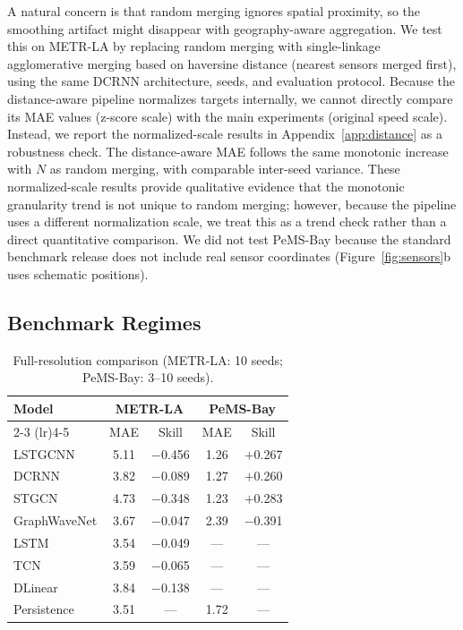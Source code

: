 \documentclass[sigconf]{acmart}
\begin{document}
A natural concern is that random merging ignores spatial proximity, so the smoothing artifact might disappear with geography-aware aggregation. We test this on METR-LA by replacing random merging with single-linkage agglomerative merging based on haversine distance (nearest sensors merged first), using the same DCRNN architecture, seeds, and evaluation protocol. Because the distance-aware pipeline normalizes targets internally, we cannot directly compare its MAE values (z-score scale) with the main experiments (original speed scale). Instead, we report the normalized-scale results in Appendix~\ref{app:distance} as a robustness check. The distance-aware MAE follows the same monotonic increase with $N$ as random merging, with comparable inter-seed variance. These normalized-scale results provide qualitative evidence that the monotonic granularity trend is not unique to random merging; however, because the pipeline uses a different normalization scale, we treat this as a trend check rather than a direct quantitative comparison. We did not test PeMS-Bay because the standard benchmark release does not include real sensor coordinates (Figure~\ref{fig:sensors}b uses schematic positions).

\subsection{Benchmark Regimes}

\begin{table}[t]
\small
\centering
\caption{Full-resolution comparison (METR-LA: 10 seeds; PeMS-Bay: 3--10 seeds).}
\label{tab:full}
\begin{tabular}{lcccc}
\toprule
Model & \multicolumn{2}{c}{METR-LA} & \multicolumn{2}{c}{PeMS-Bay} \\
\cmidrule(lr){2-3} \cmidrule(lr){4-5}
& MAE & Skill & MAE & Skill \\
\midrule
LSTGCNN      & 5.11 & $-$0.456 & 1.26 & $+$0.267 \\
DCRNN        & 3.82 & $-$0.089 & 1.27 & $+$0.260 \\
STGCN        & 4.73 & $-$0.348 & 1.23 & $+$0.283 \\
GraphWaveNet & 3.67 & $-$0.047 & 2.39 & $-$0.391 \\
\midrule
LSTM         & 3.54 & $-$0.049 & --- & --- \\
TCN          & 3.59 & $-$0.065 & --- & --- \\
DLinear      & 3.84 & $-$0.138 & --- & --- \\
\midrule
Persistence  & 3.51 & --- & 1.72 & --- \\
\bottomrule
\end{tabular}
\end{table}
\end{document}
